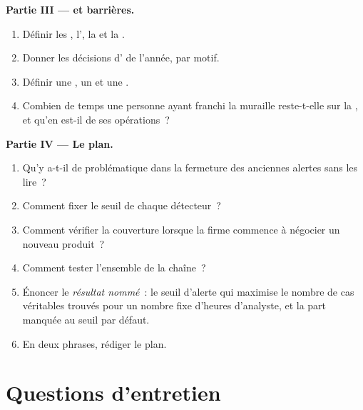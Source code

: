 \begin{problem}
\medskip\noindent\textbf{Partie III ---  et barrières.}
\begin{enumerate}[resume]
\item Définir les , l', la  et la .
\item Donner les décisions d' de l'année, par motif.
\item Définir une , un  et une .
\item Combien de temps une personne ayant franchi la muraille reste-t-elle sur la , et qu'en est-il de ses opérations~?
\end{enumerate}

\medskip\noindent\textbf{Partie IV --- Le plan.}
\begin{enumerate}[resume]
\item Qu'y a-t-il de problématique dans la fermeture des anciennes alertes sans les lire~?
\item Comment fixer le seuil de chaque détecteur~?
\item Comment vérifier la couverture lorsque la firme commence à négocier un nouveau produit~?
\item Comment tester l'ensemble de la chaîne~?
\item Énoncer le \emph{résultat nommé}~: le seuil d'alerte qui maximise le nombre de cas véritables trouvés pour un nombre fixe d'heures d'analyste, et la part
manquée au seuil par défaut.
\item En deux phrases, rédiger le plan.
\end{enumerate}
\end{problem}

\section{Questions d'entretien}

